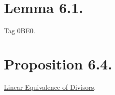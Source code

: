\section{Lemma 6.1.}

\href{https://stacks.math.columbia.edu/tag/0BE0}{Tag 0BE0}.


\section{Proposition 6.4.}

\href{https://chatgpt.com/share/69a71fab-51f4-8009-849a-bb428dca0efb}{Linear Equivalence of Divisors}.